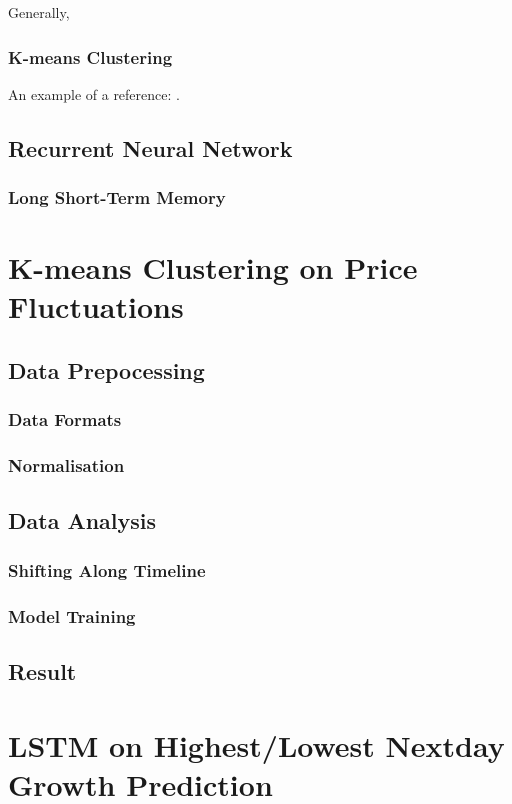 \documentclass[11pt]{article} %
\theoremstyle{plain}
\theoremstyle{definition}
\begin{document}
Generally, 

\subsubsection{K-means Clustering}

An example of a reference:
\cite{adam/dpapa:2017}.

\subsection{Recurrent Neural Network}
\subsubsection{Long Short-Term Memory}

\section{K-means Clustering on Price Fluctuations}
\subsection{Data Prepocessing}
\subsubsection{Data Formats}
\subsubsection{Normalisation}
\subsection{Data Analysis}
\subsubsection{Shifting Along Timeline}
\subsubsection{Model Training}
\subsection{Result}

\clearpage

\section{LSTM on Highest/Lowest Nextday Growth Prediction}
\end{document}
